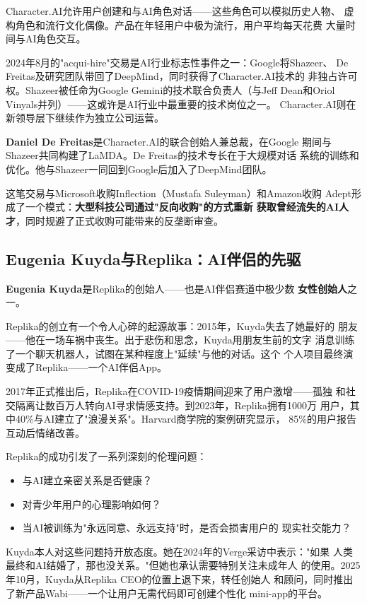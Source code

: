 Character.AI允许用户创建和与AI角色对话——这些角色可以模拟历史人物、
虚构角色和流行文化偶像。产品在年轻用户中极为流行，用户平均每天花费
大量时间与AI角色交互。

2024年8月的"acqui-hire"交易是AI行业标志性事件之一：Google将Shazeer、
De Freitas及研究团队带回了DeepMind，同时获得了Character.AI技术的
非独占许可权。Shazeer被任命为Google Gemini的技术联合负责人（与Jeff
Dean和Oriol Vinyals并列）——这或许是AI行业中最重要的技术岗位之一。
Character.AI则在新领导层下继续作为独立公司运营。

\textbf{Daniel De Freitas}是Character.AI的联合创始人兼总裁，在Google
期间与Shazeer共同构建了LaMDA。De Freitas的技术专长在于大规模对话
系统的训练和优化。他与Shazeer一同回到Google后加入了DeepMind团队。

这笔交易与Microsoft收购Inflection（Mustafa Suleyman）和Amazon收购
Adept形成了一个模式：\textbf{大型科技公司通过"反向收购"的方式重新
获取曾经流失的AI人才}，同时规避了正式收购可能带来的反垄断审查。

\subsection{Eugenia Kuyda与Replika：AI伴侣的先驱}
\label{subsec:founders-replika}

\textbf{Eugenia Kuyda}是Replika的创始人——也是AI伴侣赛道中极少数
\textbf{女性创始人}之一。

Replika的创立有一个令人心碎的起源故事：2015年，Kuyda失去了她最好的
朋友——他在一场车祸中丧生。出于悲伤和思念，Kuyda用朋友生前的文字
消息训练了一个聊天机器人，试图在某种程度上"延续"与他的对话。这个
个人项目最终演变成了Replika——一个AI伴侣App。

2017年正式推出后，Replika在COVID-19疫情期间迎来了用户激增——孤独
和社交隔离让数百万人转向AI寻求情感支持。到2023年，Replika拥有1000万
用户，其中40\%与AI建立了"浪漫关系"。Harvard商学院的案例研究显示，
85\%的用户报告互动后情绪改善。

\begin{whybox}[AI伴侣的伦理困境]
Replika的成功引发了一系列深刻的伦理问题：
\begin{itemize}
  \item 与AI建立亲密关系是否健康？
  \item 对青少年用户的心理影响如何？
  \item 当AI被训练为"永远同意、永远支持"时，是否会损害用户的
    现实社交能力？
\end{itemize}
Kuyda本人对这些问题持开放态度。她在2024年的Verge采访中表示："如果
人类最终和AI结婚了，那也没关系。"但她也承认需要特别关注未成年人
的使用。2025年10月，Kuyda从Replika CEO的位置上退下来，转任创始人
和顾问，同时推出了新产品Wabi——一个让用户无需代码即可创建个性化
mini-app的平台。
\end{whybox}

